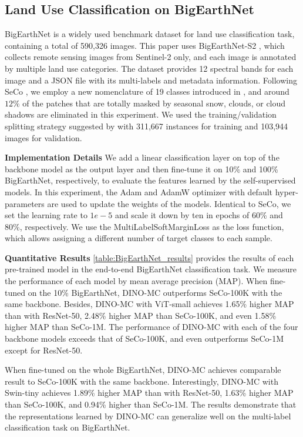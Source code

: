 \documentclass[10pt,twocolumn,letterpaper]{article}
\begin{document}
\subsection{Land Use Classification on BigEarthNet}
BigEarthNet \cite{sumbul2019bigearthnet} is a widely used benchmark dataset for land use classification task, containing a total of 590,326 images.
This paper uses BigEarthNet-S2 \cite{sumbul2019bigearthnet}, which collects remote sensing images from Sentinel-2 only, and each image is annotated by multiple land use categories.
The dataset provides 12 spectral bands for each image and a JSON file with its multi-labels and metadata information.
Following SeCo \cite{manas2021seasonal}, we employ a new nomenclature of 19 classes introduced in \cite{sumbul2020bigearthnet}, and around $12\%$ of the patches that are totally masked by seasonal snow, clouds, or cloud shadows are eliminated in this experiment.
We used the training/validation splitting strategy suggested by \cite{neumann2019domain} with 311,667 instances for training and 103,944 images for validation.

\textbf{Implementation Details }
We add a linear classification layer on top of the backbone model as the output layer and then fine-tune it on 10\% and 100\% BigEarthNet, respectively, to evaluate the features learned by the self-supervised models.
In this experiment, the Adam and AdamW optimizer with default hyper-parameters are used to update the weights of the models. 
Identical to SeCo, we set the learning rate to $1e-5$ and scale it down by ten in epochs of 60\% and 80\%, respectively.
We use the MultiLabelSoftMarginLoss as the loss function, which allows assigning a different number of target classes to each sample.

\textbf{Quantitative Results}
\cref{table:BigEarthNet_results} provides the results of each pre-trained model in the end-to-end BigEarthNet classification task.
We measure the performance of each model by mean average precision (MAP).
When fine-tuned on the 10\% BigEarthNet, DINO-MC outperforms SeCo-100K with the same backbone.
Besides, DINO-MC with ViT-small achieves 1.65\% higher MAP than with ResNet-50, 2.48\% higher MAP than SeCo-100K, and even 1.58\% higher MAP than SeCo-1M.
The performance of DINO-MC with each of the four backbone models exceeds that of SeCo-100K, and even outperforms SeCo-1M except for ResNet-50.

When fine-tuned on the whole BigEarthNet, DINO-MC achieves comparable result to SeCo-100K with the same backbone.
Interestingly, DINO-MC with Swin-tiny achieves 1.89\% higher MAP than with ResNet-50, 1.63\% higher MAP than SeCo-100K, and 0.94\% higher than SeCo-1M.
The results demonstrate that the representations learned by DINO-MC can generalize well on the multi-label classification task on BigEarthNet.
\end{document}
